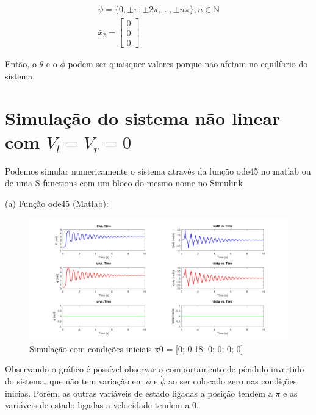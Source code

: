 \documentclass[10pt]{article}
\begin{document}
\begin{equation}
\begin{gathered}
    \bar\psi = \{0,\pm\pi,\pm 2\pi,...,\pm n\pi\}, n \in \mathbb{N} \\
    \bar{x}_2 =
    \begin{bmatrix}
        0 \\
        0 \\
        0
    \end{bmatrix}
\end{gathered}
\end{equation}

\quad Então, o $\bar\theta$ e o $\bar\phi$ podem ser quaisquer valores porque não afetam no equilíbrio do sistema.

\section{Simulação do sistema não linear com $V_l = V_r = 0$}

\quad Podemos simular numericamente o sistema através da função ode45 no matlab ou
de uma S-functions com um bloco do mesmo nome no Simulink

\newpage

\quad (a) Função ode45 (Matlab):

\begin{figure}[h]
    \centering
    \includegraphics[scale=0.229]{ode45_1.png}
    \caption{Simulação com condições iniciais x0 = [0; 0.18; 0; 0; 0; 0]}
\end{figure}

\quad Observando o gráfico é possível observar o comportamento de pêndulo invertido do sistema, que não tem variação em $\phi$ e $\dot\phi$ ao ser colocado zero nas condições inicias.
Porém, as outras variáveis de estado ligadas a posição tendem a $\pi$ e as variáveis de estado ligadas a velocidade tendem a $0$.
\end{document}
